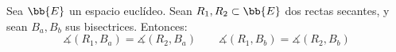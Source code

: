 \begin{prop}
    Sea $\bb{E}$ un espacio euclídeo. Sean $R_1,R_2\subset \bb{E}$ dos rectas secantes, y sean $B_a,B_b$ sus bisectrices. Entonces:
    \begin{equation*}
        \measuredangle(R_1,B_a) = \measuredangle(R_2,B_a) \qquad \measuredangle(R_1,B_b) = \measuredangle(R_2,B_b)
    \end{equation*}
\end{prop}
\begin{comment}
\begin{proof}
    Sea $p\in R_1\cap R_2$. Consideramos $u_a,u_b\in \vec{\bb{E}}$ tales que:
    \begin{equation*}
        u_a := \frac{v_1}{\|v_1\|} + \frac{v_2}{\|v_2\|} \qquad u_b := \frac{v_1}{\|v_1\|} - \frac{v_2}{\|v_2\|}
    \end{equation*}
    donde $v_1,v_2$ son los vectores directores \ul{unitarios} de $R_1$ y $R_2$ respectivamente. Sean las bisectrices $B_a=p+\cc{L}\{u_a\}$ y $B_b=p+\cc{L}\{u_b\}$.
    Tenemos que:
    \begin{equation*}
        \langle u_a, v_1\rangle
        = \left\langle \frac{v_1}{\|v_1\|} + \frac{v_2}{\|v_2\|}, v_1\right\rangle
        = \frac{1}{\|v_1\|}\langle v_1,v_1\rangle + \frac{1}{\|v_2\|}\langle v_2,v_1\rangle = \|v_1\| + \frac{1}{\|v_2\|} \langle v_2,v_1\rangle
    \end{equation*}
    \begin{equation*}
        \langle u_a, v_2\rangle
        = \left\langle \frac{v_1}{\|v_1\|} + \frac{v_2}{\|v_2\|}, v_2\right\rangle
        = \frac{1}{\|v_1\|}\langle v_1,v_2\rangle + \frac{1}{\|v_2\|}\langle v_2,v_2\rangle = \frac{1}{\|v_1\|} \langle v_1,v_2\rangle + \|v_2\|
    \end{equation*}
    \begin{equation*}
        \|v_1\|\cdot \left\|u_a\right\| = \|v_1\|\cdot \left\| \frac{v_1}{\|v_1\|} + \frac{v_2}{\|v_2\|}\right\|
        = \left\|v_1 + \frac{\|v_1\|}{\|v_2\|}\cdot v_2\right\|
    \end{equation*}
    \begin{equation*}
        \|v_2\|\cdot \left\|u_a\right\| = \|v_2\|\cdot \left\| \frac{v_1}{\|v_1\|} + \frac{v_2}{\|v_2\|}\right\|
        = \left\|\frac{\|v_2\|}{\|v_1\|}\cdot v_1 + v_2\right\|
    \end{equation*}

    Usando que $\langle v_1,v_2\rangle = \langle v_2,v_1\rangle$ y que, por la elección de $v_1,v_2$ con $\|v_1\|=\|v_2\|=1$, tenemos que:
    \begin{equation*}
        \cos \measuredangle(v_1,u_a) = \cos \measuredangle(v_2,u_a) 
    \end{equation*}


    Para comprobar que el ángulo es el mismo, basta comprobar que el ángulo entre los vectores directores de $R_1$ y $B_a$ es el mismo que el ángulo entre los vectores directores de $R_2$ y $B_a$. Es decir, basta comprobar que:
\end{proof}
\end{comment}

